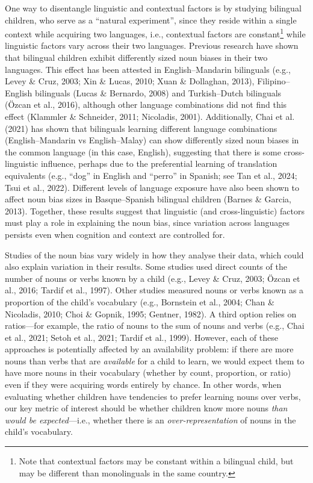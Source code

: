 \documentclass[10pt, letterpaper]{article}
\begin{document}
One way to disentangle linguistic and contextual factors is by studying
bilingual children, who serve as a ``natural experiment'', since they
reside within a single context while acquiring two languages, i.e.,
contextual factors are constant\footnote{Note that contextual factors
  may be constant within a bilingual child, but may be different than
  monolinguals in the same country.} while linguistic factors vary
across their two languages. Previous research have shown that bilingual
children exhibit differently sized noun biases in their two languages.
This effect has been attested in English--Mandarin bilinguals (e.g.,
Levey \& Cruz, 2003; Xin \& Lucas, 2010; Xuan \& Dollaghan, 2013),
Filipino--English bilinguals (Lucas \& Bernardo, 2008) and
Turkish--Dutch bilinguals (Özcan et al., 2016), although other language
combinations did not find this effect (Klammler \& Schneider, 2011;
Nicoladis, 2001). Additionally, Chai et al. (2021) has shown that
bilinguals learning different language combinations (English--Mandarin
vs English--Malay) can show differently sized noun biases in the common
language (in this case, English), suggesting that there is some
cross-linguistic influence, perhaps due to the preferential learning of
translation equivalents (e.g., ``dog'' in English and ``perro'' in
Spanish; see Tan et al., 2024; Tsui et al., 2022). Different levels of
language exposure have also been shown to affect noun bias sizes in
Basque--Spanish bilingual children (Barnes \& Garcia, 2013). Together,
these results suggest that linguistic (and cross-linguistic) factors
must play a role in explaining the noun bias, since variation across
languages persists even when cognition and context are controlled for.

Studies of the noun bias vary widely in how they analyse their data,
which could also explain variation in their results. Some studies used
direct counts of the number of nouns or verbs known by a child (e.g.,
Levey \& Cruz, 2003; Özcan et al., 2016; Tardif et al., 1997). Other
studies measured nouns or verbs known as a proportion of the child's
vocabulary (e.g., Bornstein et al., 2004; Chan \& Nicoladis, 2010; Choi
\& Gopnik, 1995; Gentner, 1982). A third option relies on ratios---for
example, the ratio of nouns to the sum of nouns and verbs (e.g., Chai et
al., 2021; Setoh et al., 2021; Tardif et al., 1999). However, each of
these approaches is potentially affected by an availability problem: if
there are more nouns than verbs that are \emph{available} for a child to
learn, we would expect them to have more nouns in their vocabulary
(whether by count, proportion, or ratio) even if they were acquiring
words entirely by chance. In other words, when evaluating whether
children have tendencies to prefer learning nouns over verbs, our key
metric of interest should be whether children know more nouns \emph{than
would be expected}---i.e., whether there is an
\emph{over-representation} of nouns in the child's vocabulary.
\end{document}
